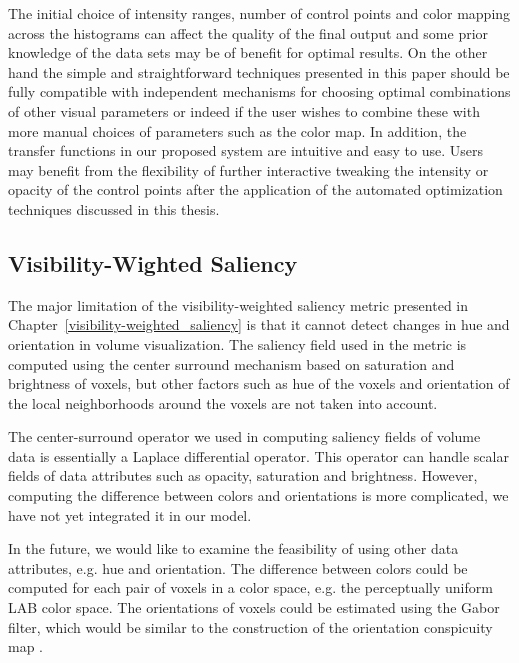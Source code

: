 The initial choice of intensity ranges, number of control points and color mapping across the histograms can affect the quality of the final output and some prior knowledge of the data sets may be of benefit for optimal results. On the other hand the simple and straightforward techniques presented in this paper should be fully compatible with independent mechanisms for choosing optimal combinations of other visual parameters or indeed if the user wishes to combine these with more manual choices of parameters such as the color map.
In addition, the transfer functions in our proposed system are intuitive and easy to use. Users may benefit from the flexibility of further interactive tweaking the intensity or opacity of the control points after the application of the automated optimization techniques discussed in this thesis.

\subsection{Visibility-Wighted Saliency}
The major limitation of the visibility-weighted saliency metric presented in Chapter~\ref{visibility-weighted_saliency} is that it cannot detect changes in hue and orientation in volume visualization. The saliency field used in the metric is computed using the center surround mechanism based on saturation and brightness of voxels, but other factors such as hue of the voxels and orientation of the local neighborhoods around the voxels are not taken into account.

The center-surround operator \cite{kim_saliency-guided_2006} we used in computing saliency fields of volume data is essentially a Laplace differential operator. This operator can handle scalar fields of data attributes such as opacity, saturation and brightness. However, computing the difference between colors and orientations is more complicated, we have not yet integrated it in our model.

In the future, we would like to examine the feasibility of using other data attributes, e.g. hue and orientation. The difference between colors could be computed for each pair of voxels in a color space, e.g. the perceptually uniform LAB color space. The orientations of voxels could be estimated using the Gabor filter, which would be similar to the construction of the orientation conspicuity map \cite{itti_model_1998}.

